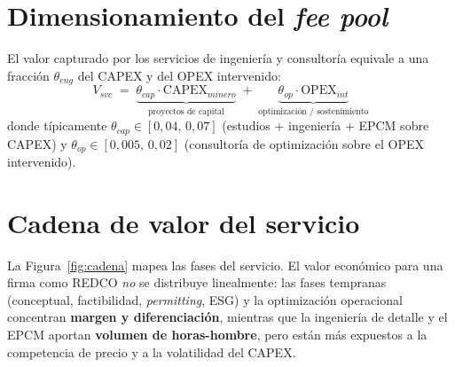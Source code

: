 \documentclass[11pt,letterpaper]{report}
\begin{document}
\section{Dimensionamiento del \emph{fee pool}}
El valor capturado por los servicios de ingeniería y consultoría equivale a una fracción $\theta_{eng}$ del CAPEX y del OPEX intervenido:
\begin{equation}
V_{svc} \;=\; \underbrace{\theta_{cap}\cdot \mathrm{CAPEX}_{minero}}_{\text{proyectos de capital}}
            \;+\; \underbrace{\theta_{op}\cdot \mathrm{OPEX}_{int}}_{\text{optimización / sostenimiento}}
\label{eq:feepool}
\end{equation}
donde típicamente $\theta_{cap}\in[0{,}04,\,0{,}07]$ (estudios + ingeniería + EPCM sobre CAPEX) y
$\theta_{op}\in[0{,}005,\,0{,}02]$ (consultoría de optimización sobre el OPEX intervenido).

\section{Cadena de valor del servicio}
La Figura~\ref{fig:cadena} mapea las fases del servicio. El valor económico para una firma como REDCO \emph{no} se distribuye
linealmente: las fases tempranas (conceptual, factibilidad, \emph{permitting}, ESG) y la optimización operacional concentran
\textbf{margen y diferenciación}, mientras que la ingeniería de detalle y el EPCM aportan \textbf{volumen de horas-hombre}, pero
están más expuestos a la competencia de precio y a la volatilidad del CAPEX.
\end{document}
